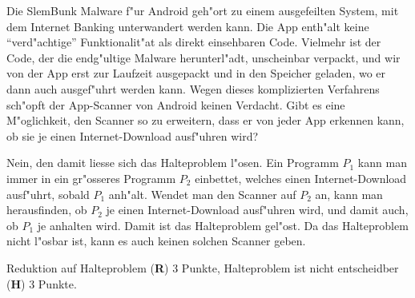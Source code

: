 Die SlemBunk Malware f"ur Android geh"ort zu einem ausgefeilten
System, mit dem Internet Banking unterwandert werden kann.
Die App enth"alt keine ``verd"achtige'' Funktionalit"at als direkt
einsehbaren Code. 
Vielmehr ist der Code, der die endg"ultige Malware herunterl"adt,
unscheinbar verpackt, und wir von der App erst zur Laufzeit
ausgepackt und in den Speicher geladen, wo er dann auch ausgef"uhrt
werden kann.
Wegen dieses komplizierten Verfahrens sch"opft der App-Scanner von
Android keinen Verdacht.
Gibt es eine M"oglichkeit, den Scanner so zu erweitern, dass er 
von jeder App erkennen kann, ob sie je einen Internet-Download
ausf"uhren wird?

\begin{loesung}
Nein, den damit liesse sich das Halteproblem l"osen.
Ein Programm $P_1$ kann man immer in ein gr"osseres Programm $P_2$
einbettet, welches einen Internet-Download ausf"uhrt, sobald $P_1$
anh"alt.
Wendet man den Scanner auf $P_2$ an,
kann man herausfinden, ob $P_2$
je einen Internet-Download ausf"uhren wird, und damit auch, ob
$P_1$ je anhalten wird.
Damit ist das Halteproblem gel"ost.
Da das Halteproblem nicht l"osbar ist, kann es auch keinen solchen
Scanner geben.
\end{loesung}

\begin{bewertung}
Reduktion auf Halteproblem ({\bf R}) 3 Punkte,
Halteproblem ist nicht entscheidber ({\bf H}) 3 Punkte.
\end{bewertung}



